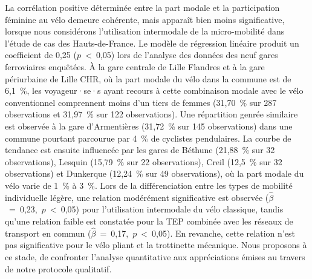 \begin{refsegment}
La corrélation positive déterminée entre la part modale et la participation féminine au vélo demeure cohérente, mais apparaît bien moins significative, lorsque nous considérons l'utilisation intermodale de la micro-mobilité dans l'étude de cas des Hauts-de-France. Le modèle de régression linéaire produit un coefficient de 0,25 ($p$~\textless~0,05) lors de l'analyse des données des neuf gares ferroviaires enquêtées. À la gare centrale de Lille Flandres et à la gare périurbaine de Lille CHR, où la part modale du vélo dans la commune est de 6,1~\%, les voyageur·se·s ayant recours à cette combinaison modale avec le vélo conventionnel comprennent moins d'un tiers de femmes (31,70~\% sur 287 observations et 31,97~\% sur 122 observations). Une répartition genrée similaire est observée à la gare d'Armentières (31,72~\% sur 145 observations) dans une commune pourtant parcourue par 4~\% de cyclistes pendulaires. La courbe de tendance est ensuite influencée par les gares de Béthune (21,88~\% sur 32 observations), Lesquin (15,79~\% sur 22 observations), Creil (12,5~\% sur 32 observations) et Dunkerque (12,24~\% sur 49 observations), où la part modale du vélo varie de 1~\% à 3~\%. Lors de la différenciation entre les types de mobilité individuelle légère, une relation modérément significative est observée ($\hat{\beta}$~=~0,23,~$p$~\textless~0,05) pour l'utilisation intermodale du vélo classique, tandis qu'une relation faible est constatée pour la \acrshort{TEP} combinée avec les réseaux de transport en commun ($\hat{\beta}$~=~0,17,~$p$~\textless~0,05). En revanche, cette relation n'est pas significative pour le vélo pliant et la trottinette mécanique. Nous proposons à ce stade, de confronter l'analyse quantitative aux appréciations émises au travers de notre protocole qualitatif.%


\end{refsegment}
